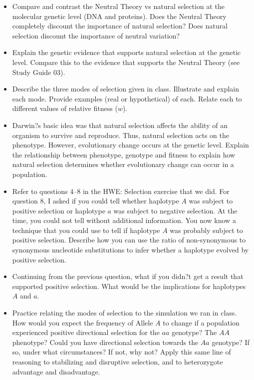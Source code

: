 \documentclass[letterpaper]{tufte-handout}
\begin{document}
\begin{itemize}
	\item Compare and contrast the Neutral Theory vs natural selection at the molecular genetic level (DNA and proteins).  Does the Neutral Theory completely discount the importance of natural selection?  Does natural selection discount the importance of neutral variation?

	\item Explain the genetic evidence that supports natural selection at the genetic level.  Compare this to the evidence that supports the Neutral Theory (see Study Guide 03).

	\item Describe the three modes of selection given in class.  Illustrate and explain each mode.  Provide examples (real or hypothetical) of each.  Relate each to different values of relative fitness ($w$).

	\item Darwin?s basic idea was that natural selection affects the ability of an organism to survive and reproduce.  Thus, natural selection acts on the phenotype.  However, evolutionary change occurs at the genetic level.  Explain the relationship between phenotype, genotype and fitness to explain how natural selection determines whether evolutionary change can occur in a population.

	\item Refer to questions 4--8 in the HWE: Selection exercise that we did.  For question 8, I asked if you could tell whether haplotype $A$ was subject to positive selection or haplotype $a$ was subject to negative selection. At the time, you could not tell without additional information.   You now know a technique that you could use to tell if haplotype $A$ was probably subject to positive selection.  Describe how you can use the ratio of non-synonymous to synonymous nucleotide substitutions to infer whether a haplotype evolved by positive selection.

	\item Continuing from the previous question, what if you didn?t get a result that supported positive selection.  What would be the implications for haplotypes $A$ and  $a$.

	\item Practice relating the modes of selection to the simulation we ran in class.  How would you expect the frequency of Allele $A$ to change if a population experienced positive directional selection for the $aa$ genotype?  The $AA$ phenotype?  Could you have directional selection towards the $Aa$ genotype?  If so, under what circumstances?  If not, why not?  Apply this same line of reasoning to stabilizing and disruptive selection, and to heterozygote advantage and disadvantage.

\end{itemize}
\end{document}
